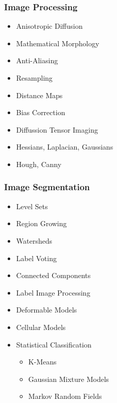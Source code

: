 \begin{frame}
\frametitle{Image Processing}
\begin{itemize}
\item Anisotropic Diffusion
\pause
\item Mathematical Morphology
\pause
\item Anti-Aliasing
\pause
\item Resampling
\pause
\item Distance Maps
\pause
\item Bias Correction
\pause
\item Diffussion Tensor Imaging
\pause
\item Hessians, Laplacian, Gaussians
\pause
\item Hough, Canny
\end{itemize}
\end{frame}

\begin{frame}
\frametitle{Image Segmentation}
\begin{itemize}
\item Level Sets
\pause
\item Region Growing
\pause
\item Watersheds
\pause
\item Label Voting
\pause
\item Connected Components
\pause
\item Label Image Processing
\pause
\item Deformable Models
\pause
\item Cellular Models
\pause
\item Statistical Classification
\begin{itemize}
\item K-Means
\item Gaussian Mixture Models
\item Markov Random Fields
\end{itemize}
\end{itemize}
\end{frame}

